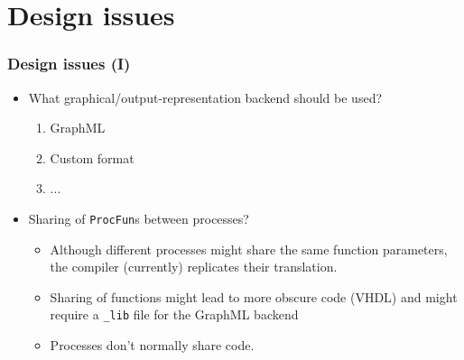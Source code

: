 \documentclass{beamer}
\begin{document}
\section{Design issues}
\begin{frame}
  \frametitle{Design issues (I)}
  \begin{itemize}
  \item What graphical/output-representation backend should be used?
    \begin{enumerate}
    \item GraphML
    \item Custom format
    \item ...
    \end{enumerate}
  \item Sharing of \texttt{ProcFun}s between processes?
    \begin{itemize}
    \item Although different processes might share the same function parameters,
      the compiler (currently) replicates their translation.
    \item Sharing of functions might lead to more obscure code (VHDL)
      and might require a \texttt{\_lib} file for the GraphML backend
    \item Processes don't normally share code.
    \end{itemize}
  \end{itemize}
\end{frame}
\end{document}
